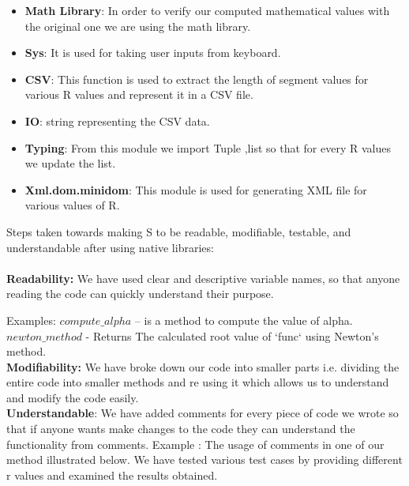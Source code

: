        
\begin{itemize}
    \item \textbf{Math Library}: In order to verify our computed mathematical values with the original one we are using the math library.
    \item \textbf{Sys}: It is used for taking user inputs from keyboard.
    \item \textbf{CSV}: This function is used to extract the length of segment values for various R values and represent it in a CSV file.
    \item \textbf{IO}:  string representing the CSV data.
    \item \textbf{Typing}: From this module we import Tuple ,list so that for every R values we update the list.
    \item \textbf{Xml.dom.minidom}: This module is used for generating XML file for various values of R.
\end{itemize}

\noindent Steps taken towards making S to be readable, modifiable, testable, and understandable after using native libraries:
 \\
 \\
\noindent \textbf{Readability:} We have used clear and descriptive variable names, so that anyone reading the code can quickly understand their purpose.

\noindent Examples: $compute\_alpha$ – is a method to compute the value of alpha. $newton\_method$ - Returns The calculated root value of `func` using Newton's method.\\

\noindent \textbf{Modifiability:} We have broke down our code into smaller parts i.e. dividing the entire code into smaller methods and re using it which allows us to understand and modify the code easily.\\

\noindent\textbf{Understandable}: We have added comments for every piece of code we wrote so that if anyone wants make changes to the code they can understand the functionality from comments.
Example :
The usage of comments in one of our method illustrated below.
We have tested various test cases by providing different r values and examined the results obtained.\\

